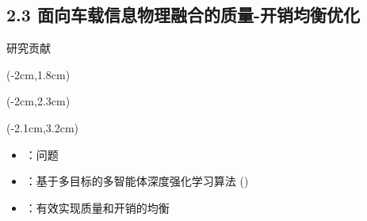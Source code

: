 \subsection[\englishfont 2.3 面向车载信息物理融合的质量-开销均衡优化]{2.3 面向车载信息物理融合的质量-开销均衡优化}

\begin{frame}{研究贡献}
\newBackground
\begin{center}
\begin{textblock*}{\textwidth}(-2cm,1.8cm)
  \small \englishfont \colorbox{cqublue}{\color{white}{创新的服务质量与系统开销均衡策略是实现}}
\end{textblock*}
\end{center}

\begin{center}
\begin{textblock*}{\textwidth}(-2cm,2.3cm)
  \small \englishfont \colorbox{cqublue}{}
\end{textblock*}
\end{center}

\begin{center}
\begin{textblock*}{\textwidth}(-2.1cm,3.2cm)
\begin{minipage}[t]{0.6\textwidth}
\begin{itemize}[itemsep=0.2\baselineskip] \englishfont 
	\item[\ding{111}] {{}：{\color{red}{双目标优化}}问题}
	\begin{itemize}[itemsep=0.2\baselineskip]
	\end{itemize}
	\item[\ding{111}] {{}：基于多目标的多智能体深度强化学习算法 ({\color{red}{MAMO}})} 
	\item[\ding{111}] {{}：有效实现质量和开销的均衡} 
\end{itemize}
\end{minipage}
\end{textblock*}
\end{center}



\end{frame}
